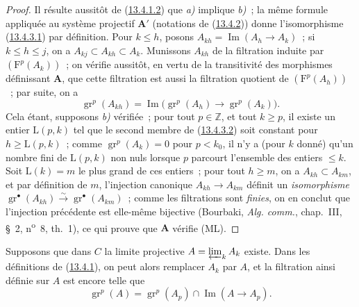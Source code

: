 \begin{proof}
Il résulte aussitôt de
(\hyperref[0.13.4.1.2-fr]{13.4.1.2}) que \emph{a)} implique \emph{b)}~; la
même formule appliquée au système projectif $\mathbf A'$ (notations de
(\hyperref[0.13.4.2-fr]{13.4.2})) donne l'isomorphisme
(\hyperref[0.13.4.3.1-fr]{13.4.3.1}) par définition. Pour $k\leq h$,
posons $A_{kh}=\operatorname{Im}(A_h\to A_k)$~; si $k\leq h\leq j$, on a
$A_{kj}\subset A_{kh}\subset A_k$. Munissons $A_{kh}$ de la filtration
induite par $(\mathrm F^p(A_k))$~; on vérifie aussitôt, en vertu de la
transitivité des morphismes définissant $\mathbf A$, que cette filtration
est aussi la filtration quotient de $(\mathrm F^p(A_h))$~; par suite, on a
\begin{equation}
\label{0.13.4.3.2-fr}
\tag{13.4.3.2}
\operatorname{gr}^p(A_{kh})=
\operatorname{Im}\bigl(\operatorname{gr}^p(A_h)\longrightarrow
\operatorname{gr}^p(A_k)\bigr).
\end{equation}
Cela étant, supposons \emph{b)} vérifiée~; pour tout $p\in\mathbb Z$, et
tout $k\geq p$, il existe un entier $\mathrm L(p,k)$ tel que le second
membre de (\hyperref[0.13.4.3.2-fr]{13.4.3.2}) soit constant pour
$h\geq\mathrm L(p,k)$~; comme $\operatorname{gr}^p(A_k)=0$ pour $p<k_0$,
il n'y a (pour $k$ donné) qu'un nombre fini de $\mathrm L(p,k)$ non nuls
lorsque $p$ parcourt l'ensemble des entiers $\leq k$. Soit
$\mathrm L(k)=m$ le plus grand de ces entiers~; pour tout $h\geq m$, on a
$A_{kh}\subset A_{km}$, et par définition de $m$, l'injection canonique
$A_{kh}\to A_{km}$ définit un \emph{isomorphisme}
$\operatorname{gr}^\bullet(A_{kh})\xrightarrow{\sim}
\operatorname{gr}^\bullet(A_{km})$~; comme les filtrations sont
\emph{finies}, on en conclut que l'injection précédente est elle-même
bijective (Bourbaki, \emph{Alg. comm.}, chap.~III, §~2,
n\textsuperscript{o}~8, th.~1), ce qui prouve que $\mathbf A$ vérifie
(ML).
\end{proof}

\begin{env}[13.4.4]
\label{0.13.4.4-fr}
Supposons que dans $C$ la limite projective
$A=\varprojlim_k A_k$ existe. Dans les définitions de
(\hyperref[0.13.4.1-fr]{13.4.1}), on peut alors remplacer $A_k$ par $A$,
et la filtration ainsi définie sur $A$ est encore telle que
\begin{equation}
\label{0.13.4.4.1-fr}
\tag{13.4.4.1}
\operatorname{gr}^p(A)=\operatorname{gr}^p(A_p)
\cap\operatorname{Im}(A\longrightarrow A_p).
\end{equation}
\end{env}

